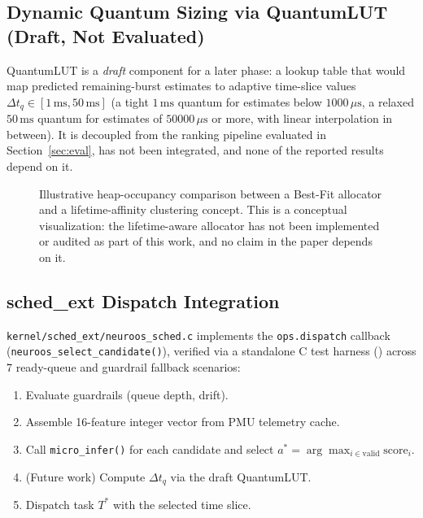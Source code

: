 \subsection{Dynamic Quantum Sizing via QuantumLUT (Draft, Not Evaluated)}
\label{subsec:lut}

QuantumLUT is a \emph{draft} component for a later phase: a lookup table that
would map predicted remaining-burst estimates to adaptive time-slice values
$\Delta t_q \in [1\,\text{ms}, 50\,\text{ms}]$ (a tight $1\,\text{ms}$ quantum
for estimates below $1000\,\mu\text{s}$, a relaxed $50\,\text{ms}$ quantum for
estimates of $50000\,\mu\text{s}$ or more, with linear interpolation in
between). It is decoupled from the ranking pipeline evaluated in
Section~\ref{sec:eval}, has not been integrated, and none of the reported
results depend on it.

\begin{figure}[t]
  \centering
  \caption{Illustrative heap-occupancy comparison between a Best-Fit allocator and a
    lifetime-affinity clustering concept. This is a conceptual visualization:
    the lifetime-aware allocator has not been implemented or audited as part of
    this work, and no claim in the paper depends on it.}
  \label{fig:memory_heatmap}
\end{figure}

\subsection{sched\_ext Dispatch Integration}
\label{subsec:schedext}

\texttt{kernel/sched\_ext/neuroos\_sched.c} implements the \texttt{ops.dispatch} callback (\texttt{neuroos\_select\_candidate()}), verified via a standalone C test harness () across 7 ready-queue and guardrail fallback scenarios:
\begin{enumerate}
  \item Evaluate guardrails (queue depth, drift).
  \item Assemble 16-feature integer vector from PMU telemetry cache.
  \item Call \texttt{micro\_infer()} for each candidate and select
    $a^* = \arg\max_{i \in \text{valid}} \text{score}_i$.
  \item (Future work) Compute $\Delta t_q$ via the draft QuantumLUT.
  \item Dispatch task $T^*$ with the selected time slice.
\end{enumerate}

